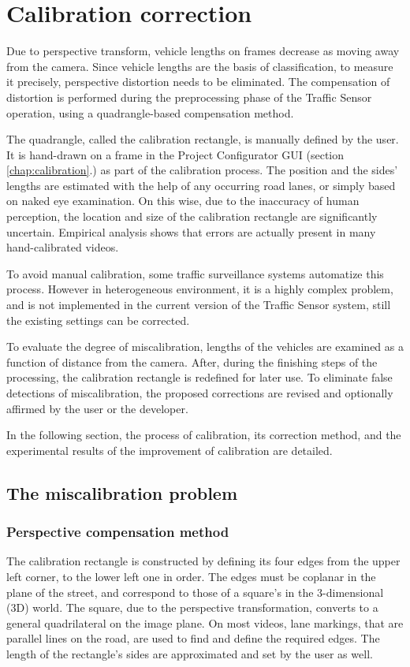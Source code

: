 \section{Calibration correction}\label{chap:cal_corr}
Due to perspective transform, vehicle lengths on frames decrease as moving away from the camera.
Since vehicle lengths are the basis of classification, to measure it precisely, perspective distortion needs to be eliminated.
The compensation of distortion is performed during the preprocessing phase of the Traffic Sensor operation, using a quadrangle-based compensation method.

The quadrangle, called the calibration rectangle, is manually defined by the user.
It is hand-drawn on a frame in the Project Configurator GUI (section \ref{chap:calibration}.) as part of the calibration process.
The position and the sides' lengths are estimated with the help of any occurring road lanes, or simply based on naked eye examination.
On this wise, due to the inaccuracy of human perception, the location and size of the calibration rectangle are significantly uncertain.
Empirical analysis shows that errors are actually present in many hand-calibrated videos.

To avoid manual calibration, some traffic surveillance systems automatize this process.
However in heterogeneous environment, it is a highly complex problem, and is not implemented in the current version of the Traffic Sensor system, still the existing settings can be corrected.

To evaluate the degree of miscalibration, lengths of the vehicles are examined as a function of distance from the camera.
After, during the finishing steps of the processing, the calibration rectangle is redefined for later use.
To eliminate false detections of miscalibration, the proposed corrections are revised and optionally affirmed by the user or the developer.

In the following section, the process of calibration, its correction method, and the experimental results of the improvement of calibration are detailed.

\subsection{The miscalibration problem}
\subsubsection{Perspective compensation method}
The calibration rectangle is constructed by defining its four edges from the upper left corner, to the lower left one in order.
The edges must be coplanar in the plane of the street, and correspond to those of a square's in the 3-dimensional (3D) world.
The square, due to the perspective transformation, converts to a general quadrilateral on the image plane.
On most videos, lane markings, that are parallel lines on the road, are used to find and define the required edges.
The length of the rectangle's sides are approximated and set by the user as well.

